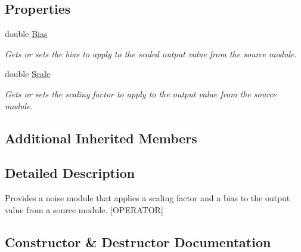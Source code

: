 \subsection*{Properties}
\begin{DoxyCompactItemize}
\item 
double \hyperlink{class_lib_noise_1_1_operator_1_1_scale_bias_a9e9f2cb9c73d0cd367b83f430728b94c}{Bias}
\begin{DoxyCompactList}\small\item\em Gets or sets the bias to apply to the scaled output value from the source module. \end{DoxyCompactList}\item 
double \hyperlink{class_lib_noise_1_1_operator_1_1_scale_bias_a005ef732bcbce3a39f9eb1e6b27d0889}{Scale}
\begin{DoxyCompactList}\small\item\em Gets or sets the scaling factor to apply to the output value from the source module. \end{DoxyCompactList}\end{DoxyCompactItemize}
\subsection*{Additional Inherited Members}


\subsection{Detailed Description}
Provides a noise module that applies a scaling factor and a bias to the output value from a source module. \mbox{[}O\+P\+E\+R\+A\+T\+OR\mbox{]} 



\subsection{Constructor \& Destructor Documentation}
\mbox{\label{class_lib_noise_1_1_operator_1_1_scale_bias_aa1d2fe3d33ddc751071b19a7965ab400}} 
